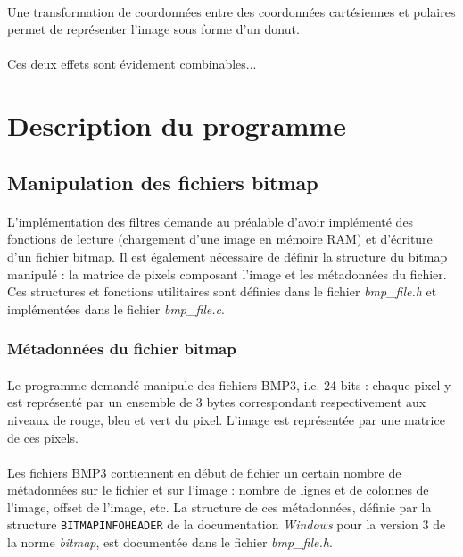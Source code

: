 \documentclass{article}
\begin{document}
    \paragraph{}
    Une transformation de coordonnées entre des coordonnées cartésiennes et polaires permet de représenter l’image sous forme d’un donut.
    
    \paragraph{}
    Ces deux effets sont évidement combinables...




    \newpage
    \section{Description du programme}
    \subsection{Manipulation des fichiers bitmap}
    \paragraph{}
    L'implémentation des filtres demande au préalable d'avoir implémenté des fonctions de lecture (chargement d'une image en mémoire RAM) et d'écriture d'un fichier bitmap. Il est également nécessaire de définir la structure du bitmap manipulé : la matrice de pixels composant l'image et les métadonnées du fichier. Ces structures et fonctions utilitaires sont définies dans le fichier \emph{bmp\_file.h} et implémentées dans le fichier \emph{bmp\_file.c}.


    \subsubsection{Métadonnées du fichier bitmap}
    \paragraph{}
    Le programme demandé manipule des fichiers BMP3, i.e. 24 bits : chaque pixel y est représenté par un ensemble de 3 bytes correspondant respectivement aux niveaux de rouge, bleu et vert du pixel. L'image est représentée par une matrice de ces pixels.

    \paragraph{}
    Les fichiers BMP3 contiennent en début de fichier un certain nombre de métadonnées sur le fichier et sur l'image : nombre de lignes et de colonnes de l'image, offset de l'image, etc. La structure de ces métadonnées, définie par la structure \texttt{BITMAPINFOHEADER} de la documentation \emph{Windows} pour la version 3 de la norme \emph{bitmap}, est documentée dans le fichier \emph{bmp\_file.h}.
    
\end{document}
